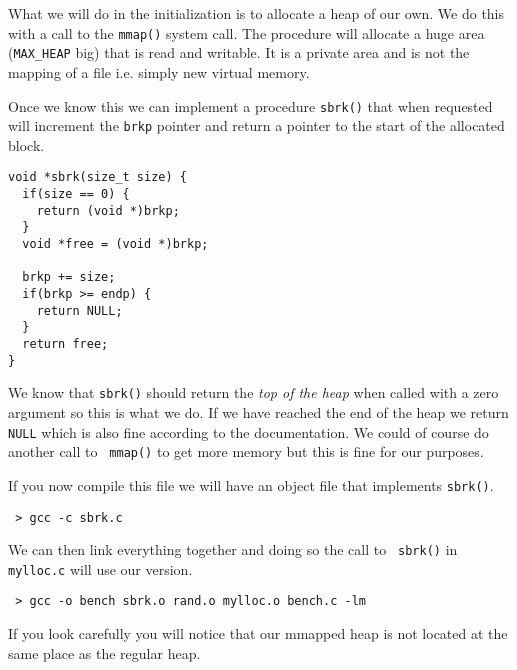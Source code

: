 \documentclass[a4paper,11pt]{article}
\begin{document}
What we will do in the initialization is to allocate a heap of our
own. We do this with a call to the {\tt mmap()} system call. The
procedure will allocate a huge area ({\tt MAX\_HEAP} big) that is read
and writable. It is a private area and is not the mapping of a file
i.e. simply new virtual memory.

Once we know this we can implement a procedure {\tt sbrk()} that when
requested will increment the {\tt brkp} pointer and return a pointer
to the start of the allocated block. 

\begin{lstlisting}
void *sbrk(size_t size) {
  if(size == 0) {
    return (void *)brkp;
  }
  void *free = (void *)brkp;

  brkp += size;
  if(brkp >= endp) {
    return NULL;
  }
  return free;
}
\end{lstlisting}

We know that {\tt sbrk()} should return the {\em top of the heap} when
called with a zero argument so this is what we do. If we have reached
the end of the heap we return {\tt NULL} which is also fine according
to the documentation. We could of course do another call to {\tt
  mmap()} to get more memory but this is fine for our purposes.

If you now compile this file we will have an object file that implements {\tt sbrk()}. 

\begin{verbatim}
 > gcc -c sbrk.c
\end{verbatim}

We can then link everything together and doing so the call to {\tt
  sbrk()} in {\tt mylloc.c} will use our version.

\begin{verbatim}
 > gcc -o bench sbrk.o rand.o mylloc.o bench.c -lm
\end{verbatim}

If you look carefully you will notice that our mmapped heap is not
located at the same place as the regular heap.
\end{document}
